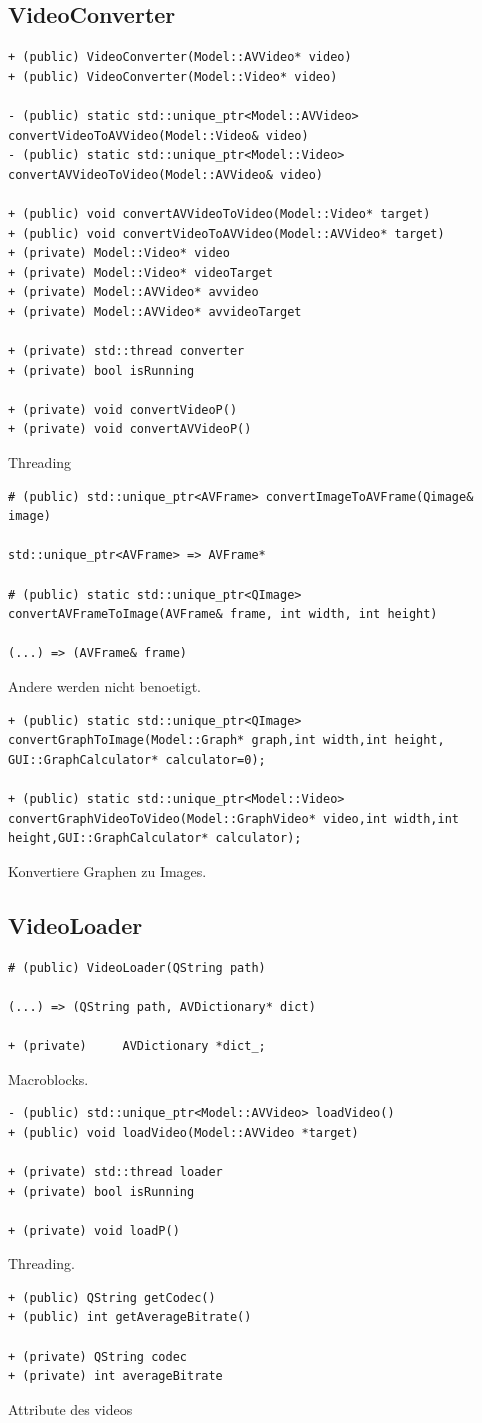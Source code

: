 \documentclass[parskip=full]{scrartcl}
\begin{document}
\subsection{VideoConverter}
\begin{verbatim}
+ (public) VideoConverter(Model::AVVideo* video)
+ (public) VideoConverter(Model::Video* video)

- (public) static std::unique_ptr<Model::AVVideo> convertVideoToAVVideo(Model::Video& video)
- (public) static std::unique_ptr<Model::Video> convertAVVideoToVideo(Model::AVVideo& video)

+ (public) void convertAVVideoToVideo(Model::Video* target)
+ (public) void convertVideoToAVVideo(Model::AVVideo* target)
+ (private) Model::Video* video
+ (private) Model::Video* videoTarget
+ (private) Model::AVVideo* avvideo
+ (private) Model::AVVideo* avvideoTarget

+ (private) std::thread converter
+ (private) bool isRunning

+ (private) void convertVideoP()
+ (private) void convertAVVideoP()
\end{verbatim}
Threading
\begin{verbatim}
# (public) std::unique_ptr<AVFrame> convertImageToAVFrame(Qimage& image)

std::unique_ptr<AVFrame> => AVFrame*

# (public) static std::unique_ptr<QImage> convertAVFrameToImage(AVFrame& frame, int width, int height)

(...) => (AVFrame& frame)
\end{verbatim}
Andere werden nicht benoetigt.
\begin{verbatim}
+ (public) static std::unique_ptr<QImage> convertGraphToImage(Model::Graph* graph,int width,int height, GUI::GraphCalculator* calculator=0);

+ (public) static std::unique_ptr<Model::Video> convertGraphVideoToVideo(Model::GraphVideo* video,int width,int height,GUI::GraphCalculator* calculator);

\end{verbatim}
Konvertiere Graphen zu Images.
\subsection{VideoLoader}
\begin{verbatim}
# (public) VideoLoader(QString path)

(...) => (QString path, AVDictionary* dict)

+ (private) 	AVDictionary *dict_;
\end{verbatim}
Macroblocks.
\begin{verbatim}
- (public) std::unique_ptr<Model::AVVideo> loadVideo()
+ (public) void loadVideo(Model::AVVideo *target)

+ (private) std::thread loader
+ (private) bool isRunning

+ (private) void loadP()
\end{verbatim}
Threading.
\begin{verbatim}
+ (public) QString getCodec()
+ (public) int getAverageBitrate()

+ (private) QString codec
+ (private) int averageBitrate
\end{verbatim}
Attribute des videos
\end{document}
